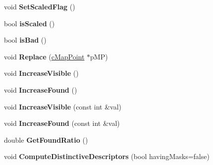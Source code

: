 \begin{DoxyCompactItemize}
\item 
void {\bfseries Set\+Scaled\+Flag} ()\hypertarget{classMultiColSLAM_1_1cMapPoint_a9362b1df45a15da916906f9b16ab7e94}{}\label{classMultiColSLAM_1_1cMapPoint_a9362b1df45a15da916906f9b16ab7e94}

\item 
bool {\bfseries is\+Scaled} ()\hypertarget{classMultiColSLAM_1_1cMapPoint_a5e25b640143f76cdf11db03c0e7c2490}{}\label{classMultiColSLAM_1_1cMapPoint_a5e25b640143f76cdf11db03c0e7c2490}

\item 
bool {\bfseries is\+Bad} ()\hypertarget{classMultiColSLAM_1_1cMapPoint_a692d972bb230c686c2dd3612b29df533}{}\label{classMultiColSLAM_1_1cMapPoint_a692d972bb230c686c2dd3612b29df533}

\item 
void {\bfseries Replace} (\hyperlink{classMultiColSLAM_1_1cMapPoint}{c\+Map\+Point} $\ast$p\+MP)\hypertarget{classMultiColSLAM_1_1cMapPoint_a907424cc2c7af196ad3388417e8278bb}{}\label{classMultiColSLAM_1_1cMapPoint_a907424cc2c7af196ad3388417e8278bb}

\item 
void {\bfseries Increase\+Visible} ()\hypertarget{classMultiColSLAM_1_1cMapPoint_a18cbb8806118b3ab68f413141af27400}{}\label{classMultiColSLAM_1_1cMapPoint_a18cbb8806118b3ab68f413141af27400}

\item 
void {\bfseries Increase\+Found} ()\hypertarget{classMultiColSLAM_1_1cMapPoint_a1d65530b9cecb51bc24e689b318738a5}{}\label{classMultiColSLAM_1_1cMapPoint_a1d65530b9cecb51bc24e689b318738a5}

\item 
void {\bfseries Increase\+Visible} (const int \&val)\hypertarget{classMultiColSLAM_1_1cMapPoint_aba0f6db5e85122080398f9c436d950c6}{}\label{classMultiColSLAM_1_1cMapPoint_aba0f6db5e85122080398f9c436d950c6}

\item 
void {\bfseries Increase\+Found} (const int \&val)\hypertarget{classMultiColSLAM_1_1cMapPoint_aa2b578566309b5d8a2dcdf6519402f07}{}\label{classMultiColSLAM_1_1cMapPoint_aa2b578566309b5d8a2dcdf6519402f07}

\item 
double {\bfseries Get\+Found\+Ratio} ()\hypertarget{classMultiColSLAM_1_1cMapPoint_a8e22e30b5598283c0514eb33490f1b00}{}\label{classMultiColSLAM_1_1cMapPoint_a8e22e30b5598283c0514eb33490f1b00}

\item 
void {\bfseries Compute\+Distinctive\+Descriptors} (bool having\+Masks=false)\hypertarget{classMultiColSLAM_1_1cMapPoint_a11f38fa3463e52d099cf4462bd0dd4bc}{}\label{classMultiColSLAM_1_1cMapPoint_a11f38fa3463e52d099cf4462bd0dd4bc}


\end{DoxyCompactItemize}
